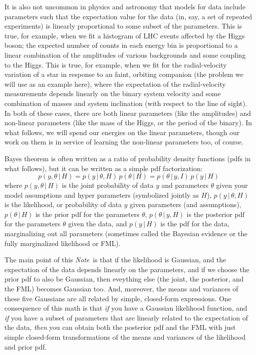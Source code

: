 \documentclass[12pt, letterpaper]{article}
\newcommand{\documentname}{\textsl{Note}}
\newcommand{\acronym}[1]{\small{#1}}
\newcommand{\FML}{\acronym{FML}}
\newcommand{\given}{\,|\,}
\begin{document}
It is also not uncommon in physics and astronomy that models for data
include parameters such that the expectation value for the data (in,
say, a set of repeated experiments) is linearly proportional to some
subset of the parameters.
This is true, for example, when we fit a histogram of LHC events
affected by the Higgs boson; the expected number of counts in each
energy bin is proportional to a linear combination of the amplitudes
of various backgrounds and some coupling to the Higgs.
This is true, for example, when we fit for the radial-velocity
variation of a star in response to an faint, orbiting companion (the
problem we will use as an example here), where the expectation of the
radial-velocity measurements depends linearly on the binary system
velocity and some combination of masses and system inclination (with
respect to the line of sight).
In both of these cases, there are both linear parameters (like the
amplitudes) and non-linear parameters (like the mass of the Higgs, or
the period of the binary).
In what follows, we will spend our energies on the linear parameters,
though our work on them is in service of learning the non-linear
parameters too, of course.

Bayes theorem is often written as a ratio of probability density
functions (pdfs in what follows), but it can be written as a simple
pdf factorization:
\begin{equation}
p(y,\theta\given H) = p(y\given\theta,H)\,p(\theta\given H) = p(\theta\given y,I)\,p(y\given H)
\end{equation}
where
$p(y,\theta\given H)$ is the joint probability of data $y$ and
parameters $\theta$ given your model assumptions and hyper parameters
(symbolized jointly as $H$),
$p(y\given\theta,H)$ is the likelihood, or probability of data $y$
given parameters (and assumptions),
$p(\theta\given H)$ is the prior pdf for the parameters $\theta$,
$p(\theta\given y,H)$ is the posterior pdf for the parameters $\theta$
given the data,
and
$p(y\given H)$ is the pdf for the data, marginalizing out all
parameters (sometimes called the Bayesian evidence or the fully
marginalized likelihood or \FML).

The main point of this \documentname\ is that if the likelihood is
Gaussian, and the expectation of the data depends linearly on the
parameters, and if we choose the prior pdf to also be Gaussian, then
eveything else (the joint, the posterior, and the \FML) becomes
Gaussian too.
And, moreover, the means and variances of these five Gaussians are all
related by simple, closed-form expressions.
One consequence of this math is that \emph{if} you have a Gaussian
likelihood function, and \emph{if} you have a subset of parameters
that are linearly related to the expectation of the data, \emph{then}
you can obtain both the posterior pdf and the FML with just simple
closed-form transformations of the means and variances of the
likelihood and prior pdf.
\end{document}
